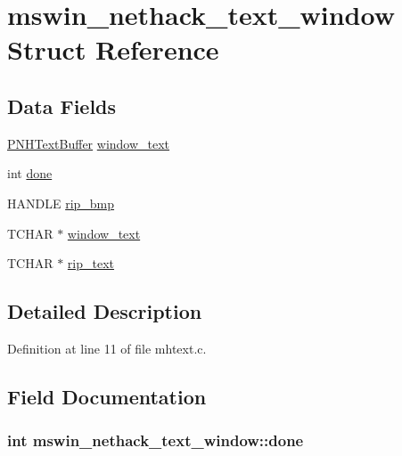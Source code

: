 \hypertarget{structmswin__nethack__text__window}{\section{mswin\+\_\+nethack\+\_\+text\+\_\+window Struct Reference}
\label{structmswin__nethack__text__window}
}
\subsection*{Data Fields}
\begin{DoxyCompactItemize}
\item 
\hyperlink{mhtxtbuf_8c_a1dd05af79bf8ee000da64ac915b745b1}{P\+N\+H\+Text\+Buffer} \hyperlink{structmswin__nethack__text__window_a103624299b7831b14459a3a7b47c0271}{window\+\_\+text}
\item 
int \hyperlink{structmswin__nethack__text__window_a7e683da7c6146eb8003bac175347383d}{done}
\item 
H\+A\+N\+D\+L\+E \hyperlink{structmswin__nethack__text__window_a036fad5d1b1b14381da83f420e320ab2}{rip\+\_\+bmp}
\item 
T\+C\+H\+A\+R $\ast$ \hyperlink{structmswin__nethack__text__window_aadd9eebf8d5c2fd965c26ac77549f748}{window\+\_\+text}
\item 
T\+C\+H\+A\+R $\ast$ \hyperlink{structmswin__nethack__text__window_af374dae4520a7ffae334d26ea9d86bce}{rip\+\_\+text}
\end{DoxyCompactItemize}


\subsection{Detailed Description}


Definition at line 11 of file mhtext.\+c.



\subsection{Field Documentation}
\hypertarget{structmswin__nethack__text__window_a7e683da7c6146eb8003bac175347383d}{
\subsubsection[{done}]{\setlength{\rightskip}{0pt plus 5cm}int mswin\+\_\+nethack\+\_\+text\+\_\+window\+::done}}\label{structmswin__nethack__text__window_a7e683da7c6146eb8003bac175347383d}


